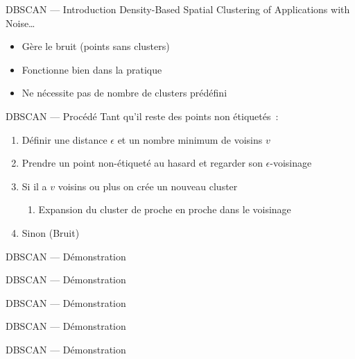 
\begin{frame}{DBSCAN --- Introduction}
  Density-Based Spatial Clustering of Applications with Noise…

  \begin{itemize}[<+->]
    \item Gère le bruit (points sans clusters)
    \item Fonctionne bien dans la pratique
    \item Ne nécessite pas de nombre de clusters prédéfini
  \end{itemize}
\end{frame}

\begin{frame}{DBSCAN --- Procédé}
  Tant qu'il reste des points non étiquetés~:

  \begin{enumerate}
  \item Définir une distance $\epsilon$ et un nombre minimum de voisins $v$
  \item Prendre un point non-étiqueté au hasard et regarder son $\epsilon$-voisinage
  \item Si il a $v$ voisins ou plus on crée un nouveau cluster
    \begin{enumerate}
    \item Expansion du cluster de proche en proche dans le voisinage
    \end{enumerate}
  \item Sinon (Bruit)
  \end{enumerate}
\end{frame}

\begin{frame}{DBSCAN --- Démonstration}
\end{frame}

\begin{frame}{DBSCAN --- Démonstration}
\end{frame}

\begin{frame}{DBSCAN --- Démonstration}
\end{frame}

\begin{frame}{DBSCAN --- Démonstration}
\end{frame}

\begin{frame}{DBSCAN --- Démonstration}
\end{frame}

